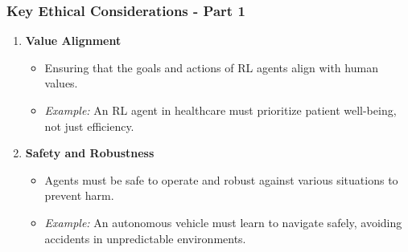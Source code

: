\documentclass{beamer}
\begin{document}
\begin{frame}[fragile]
    \frametitle{Key Ethical Considerations - Part 1}
    \begin{enumerate}
        \item \textbf{Value Alignment}
            \begin{itemize}
                \item Ensuring that the goals and actions of RL agents align with human values.
                \item \textit{Example:} An RL agent in healthcare must prioritize patient well-being, not just efficiency.
            \end{itemize}
    
        \item \textbf{Safety and Robustness}
            \begin{itemize}
                \item Agents must be safe to operate and robust against various situations to prevent harm.
                \item \textit{Example:} An autonomous vehicle must learn to navigate safely, avoiding accidents in unpredictable environments.
            \end{itemize}
    \end{enumerate}
\end{frame}
\end{document}
